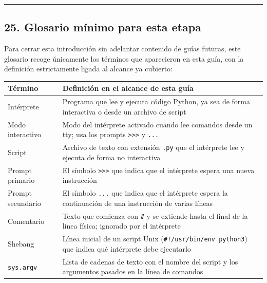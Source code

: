 \documentclass[
  doc,
  floatsintext,
  longtable,
  a4paper,
  nolmodern,
  notxfonts,
  notimes,
  12pt,
  colorlinks=true,linkcolor=blue,citecolor=blue,urlcolor=blue]{apa7}
\newcounter{none} %
\begin{document}
\begin{center}\rule{0.5\linewidth}{0.5pt}\end{center}

\subsection{25. Glosario mínimo para esta
etapa}\label{glosario-muxednimo-para-esta-etapa}

Para cerrar esta introducción sin adelantar contenido de guías futuras,
este glosario recoge únicamente los términos que aparecieron en esta
guía, con la definición estrictamente ligada al alcance ya cubierto:

{\def\LTcaptype{none} %
\begin{longtable}[]{@{}
  >{\raggedright\arraybackslash}p{}
  >{\raggedright\arraybackslash}p{}@{}}
\toprule\noalign{}
\begin{minipage}[b]{\linewidth}\raggedright
Término
\end{minipage} & \begin{minipage}[b]{\linewidth}\raggedright
Definición en el alcance de esta guía
\end{minipage} \\
\midrule\noalign{}
\endhead
\bottomrule\noalign{}
\endlastfoot
Intérprete & Programa que lee y ejecuta código Python, ya sea de forma
interactiva o desde un archivo de script \\
Modo interactivo & Modo del intérprete activado cuando lee comandos
desde un tty; usa los prompts
\texttt{\textgreater{}\textgreater{}\textgreater{}} y \texttt{...} \\
Script & Archivo de texto con extensión \texttt{.py} que el intérprete
lee y ejecuta de forma no interactiva \\
Prompt primario & El símbolo
\texttt{\textgreater{}\textgreater{}\textgreater{}} que indica que el
intérprete espera una nueva instrucción \\
Prompt secundario & El símbolo \texttt{...} que indica que el intérprete
espera la continuación de una instrucción de varias líneas \\
Comentario & Texto que comienza con \texttt{\#} y se extiende hasta el
final de la línea física; ignorado por el intérprete \\
Shebang & Línea inicial de un script Unix
(\texttt{\#!/usr/bin/env\ python3}) que indica qué intérprete debe
ejecutarlo \\
\texttt{sys.argv} & Lista de cadenas de texto con el nombre del script y
los argumentos pasados en la línea de comandos \\
\end{longtable}
}
\end{document}
